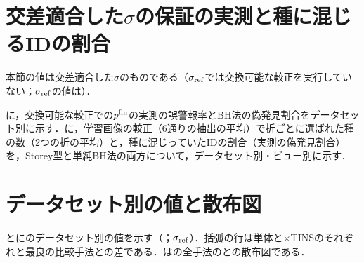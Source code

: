 \begin{table}[htbp]
\centering
\caption{共変量シフトしたIDを加えたテスト集合（[\%]，単体，6通りの抽出の平均）．}
\label{tab:csid}
\vspace{1.5mm}

\end{table}

\section{交差適合した$\sigma$の保証の実測と種に混じるIDの割合}
\label{sec:app_fdp}
本節の値は交差適合した$\sigma$のものである（$\sigma_{\mathrm{ref}}$では交換可能な較正を実行していない；$\sigma_{\mathrm{ref}}$の値は）．

に，交換可能な較正での$\pfin$の実測の誤警報率とBH法の偽発見割合をデータセット別に示す．に，学習画像の較正（6通りの抽出の平均）で折ごとに選ばれた種の数（2つの折の平均）と，種に混じっていたIDの割合（実測の偽発見割合）を，Storey型と単純BH法の両方について，データセット別・ビュー別に示す．

\begin{table}[htbp]
\centering
\caption{交差適合した$\sigma$の$\pfin$の保証の実測（交換可能な較正：IDの検証画像からクラスあたり4枚を較正画像とし，\NVcalNSplits{}通りの抽出の平均，単体）．IDの誤警報率は$\pfin\le\alpha$と判定されたIDのテスト画像の割合（命題4(i)：$\le\alpha$），偽発見割合はBH法（$q{=}0.2$）で棄却された画像のうちIDの割合（命題4(ii)：期待値$\le0.2$），再現率は未知のうち棄却された割合．}
\label{tab:val}
\vspace{1.5mm}

\end{table}

\begin{table}[htbp]
\centering
\caption{学習画像の較正で交差適合した$\sigma$に選ばれた種（折あたり，6通りの抽出の平均）．種は種の数，ID率は種に混じっていたIDの割合（実測の偽発見割合，水準$q{=}0.2$）．}
\label{tab:fdp}
\vspace{1.5mm}

\end{table}

\section{データセット別の値と散布図}
\label{sec:app_four}
とにのデータセット別の値を示す（；$\sigma_{\mathrm{ref}}$）．括弧の行は単体と$\times$TINSのそれぞれと最良の比較手法との差である．はの全手法の\AUC{}と\FPR{}の散布図である．

